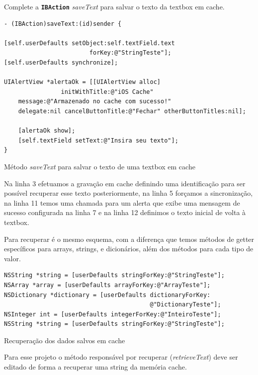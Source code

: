 \documentclass[a4paper,12pt,brazil,oneside]{book}
\begin{document}
Complete a \texttt{\textbf{IBAction}} \emph{saveText} para salvar o texto da textbox em cache.

\begin{listing}[H]
\begin{verbatim}
- (IBAction)saveText:(id)sender {
    
[self.userDefaults setObject:self.textField.text 
						forKey:@"StringTeste"];
[self.userDefaults synchronize];
    
UIAlertView *alertaOk = [[UIAlertView alloc] 
				initWithTitle:@"iOS Cache" 
	message:@"Armazenado no cache com sucesso!"
	delegate:nil cancelButtonTitle:@"Fechar" otherButtonTitles:nil];
    
    [alertaOk show];
    [self.textField setText:@"Insira seu texto"];
}
\end{verbatim}
\caption{Método \emph{saveText} para salvar o texto de uma textbox em cache}
\end{listing}


Na linha 3 efetuamos a gravação em cache definindo uma identificação para ser possível recuperar esse texto posteriormente, na linha 5 forçamos a sincronização, na linha 11 temos uma chamada para um alerta que exibe uma mensagem de sucesso configurada na linha 7 e na linha 12 definimos o texto inicial de volta à textbox.


Para recuperar é o mesmo esquema, com a diferença que temos métodos de getter específicos para arrays, strings, e dicionários, além dos métodos para cada tipo de valor.

\begin{listing}[H]
\begin{verbatim}
NSString *string = [userDefaults stringForKey:@"StringTeste"];
NSArray *array = [userDefaults arrayForKey:@"ArrayTeste"];
NSDictionary *dictionary = [userDefaults dictionaryForKey:
                                         @"DictionaryTeste"];
NSInteger int = [userDefaults integerForKey:@"InteiroTeste"];
NSString *string = [userDefaults stringForKey:@"StringTeste"];
\end{verbatim}
\caption{Recuperação dos dados salvos em cache}
\end{listing}


Para esse projeto o método responsável por recuperar (\emph{retrieveText}) deve ser editado de forma a recuperar uma string da memória cache.
\end{document}
